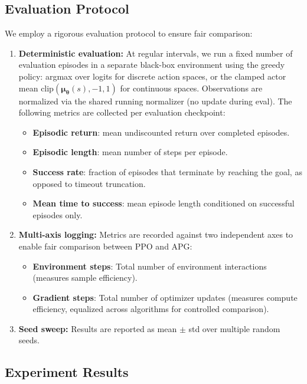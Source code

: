 \documentclass[11pt,a4paper]{article}
\newcommand{\btheta}{\bm{\theta}}
\newcommand{\bmu}{\bm{\mu}}
\begin{document}
\subsection{Evaluation Protocol}
\label{sec:eval_protocol}

We employ a rigorous evaluation protocol to ensure fair comparison:

\begin{enumerate}
  \item \textbf{Deterministic evaluation:} At regular intervals, we run a fixed number of evaluation episodes in a separate black-box environment using the greedy policy: argmax over logits for discrete action spaces, or the clamped actor mean $\text{clip}(\bmu_{\btheta}(s), -1, 1)$ for continuous spaces. Observations are normalized via the shared running normalizer (no update during eval). The following metrics are collected per evaluation checkpoint:
  \begin{itemize}
    \item \textbf{Episodic return}: mean undiscounted return over completed episodes.
    \item \textbf{Episodic length}: mean number of steps per episode.
    \item \textbf{Success rate}: fraction of episodes that terminate by reaching the goal, as opposed to timeout truncation.
    \item \textbf{Mean time to success}: mean episode length conditioned on successful episodes only.
  \end{itemize}

  \item \textbf{Multi-axis logging:} Metrics are recorded against two independent axes to enable fair comparison between PPO and APG:
  \begin{itemize}
    \item \textbf{Environment steps}: Total number of environment interactions (measures sample efficiency).
    \item \textbf{Gradient steps}: Total number of optimizer updates (measures compute efficiency, equalized across algorithms for controlled comparison).
  \end{itemize}

  \item \textbf{Seed sweep:} Results are reported as mean $\pm$ std over multiple random seeds.
\end{enumerate}

\subsection{Experiment Results}
\label{sec:results}
\end{document}
